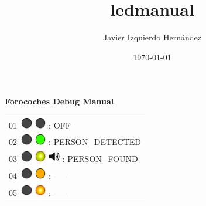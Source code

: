 \documentclass[12pt, a4paper]{report}
\title{ledmanual}
\author{Javier Izquierdo Hernández}
\date{\today}
\begin{document}
	\thispagestyle{empty}
	\centering
	{\bfseries\Huge Forocoches Debug Manual \par}
	\vspace{1cm}
	\begin{minipage}{0.6\textwidth}
	\centering
	\begin{Large}
	
	\begin{tabular}{l}
		01\  \includegraphics*[width=5mm]{off_led} \includegraphics*[width=5mm]{off_led} : OFF\\
		
		02\  \includegraphics*[width=5mm]{off_led} \includegraphics*[width=5mm]{green_led} : PERSON\_DETECTED\\
		
		03\  \includegraphics*[width=5mm]{off_led} \includegraphics*[width=5mm]{green_led_flashing}  \includegraphics*[width=5mm]{speaker} : PERSON\_FOUND\\

		04\  \includegraphics*[width=5mm]{off_led} \includegraphics*[width=5mm]{orange_led} : -----\\
		
		05\  \includegraphics*[width=5mm]{off_led} \includegraphics*[width=5mm]{orange_led_flashing} : -----\\
		

\end{tabular}
\end{Large}
\end{minipage}
\end{document}
